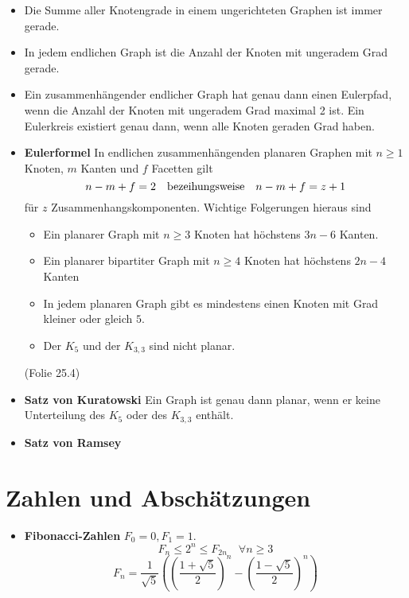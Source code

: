 \documentclass[landscape, 8pt, a4paper]{extarticle}
\begin{document}
\begin{multicols}{3}
	\begin{itemize}
		\item Die Summe aller Knotengrade in einem ungerichteten Graphen ist immer gerade.
		\item In jedem endlichen Graph ist die Anzahl der Knoten mit ungeradem Grad gerade.
		\item Ein zusammenhängender endlicher Graph hat genau dann einen Eulerpfad, wenn die Anzahl der Knoten mit ungeradem Grad maximal 2 ist. Ein Eulerkreis existiert genau dann, wenn alle Knoten geraden Grad haben.
		\item \textbf{Eulerformel} In endlichen zusammenhängenden planaren Graphen mit $n\geq 1$ Knoten, $m$ Kanten und $f$ Facetten gilt
		\begin{equation*}
			n-m+f=2\text{\quad bezeihungsweise\quad}n-m+f=z+1
		\end{equation*}
		für $z$ Zusammenhangskomponenten.
		Wichtige Folgerungen hieraus sind
		\begin{itemize}
			\item Ein planarer Graph mit $n\geq 3$ Knoten hat höchstens $3n-6$ Kanten.
			\item Ein planarer bipartiter Graph mit $n\geq 4$ Knoten hat höchstens $2n-4$ Kanten
			\item In jedem planaren Graph gibt es mindestens einen Knoten mit Grad kleiner oder gleich $5$.
			\item Der $K_5$ und der $K_{3,3}$ sind nicht planar.
		\end{itemize} (Folie 25.4)

		\item \textbf{Satz von Kuratowski} Ein Graph ist genau dann planar, wenn er keine Unterteilung des $K_5$ oder des $K_{3,3}$ enthält.

		\item \textbf{Satz von Ramsey} 
	\end{itemize}



	\section{Zahlen und Abschätzungen}
	\begin{itemize}
		\item \textbf{Fibonacci-Zahlen} $F_0=0, F_1=1$. 
		\begin{equation*}
			F_{n}\leq 2^n\leq F_{2n}\quad \forall n\geq 3
		\end{equation*}
		\begin{equation*}
			F_n=\frac{1}{\sqrt 5}\left(\left(\frac{1+\sqrt 5}{2}\right)^n-\left(\frac{1-\sqrt 5}{2}\right)^n\right)
		\end{equation*}


\end{itemize}
\end{multicols}
\end{document}
